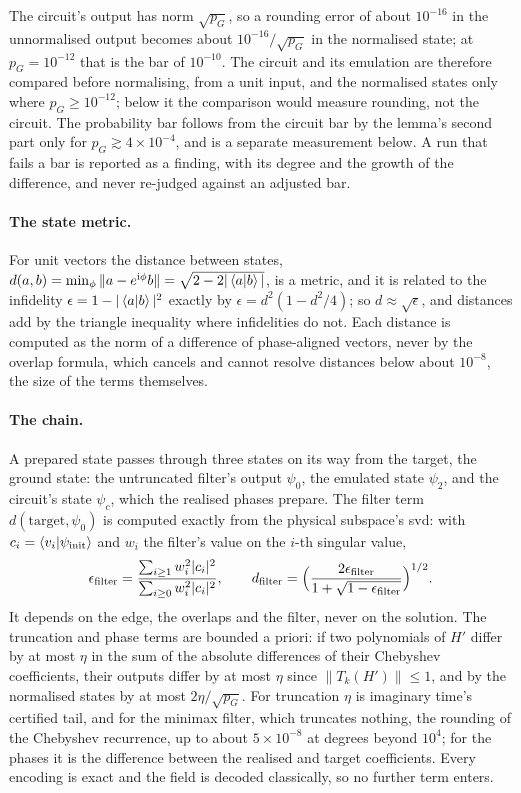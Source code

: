 The circuit's output has norm $\sqrt{p_G}$, so a rounding error of about $10^{-16}$ in the unnormalised output becomes about $10^{-16}/\sqrt{p_G}$ in the normalised state; at $p_G=10^{-12}$ that is the bar of $10^{-10}$. The circuit and its emulation are therefore compared before normalising, from a unit input, and the normalised states only where $p_G\ge10^{-12}$; below it the comparison would measure rounding, not the circuit. The probability bar follows from the circuit bar by the lemma's second part only for $p_G\gtrsim4\times10^{-4}$, and is a separate measurement below. A run that fails a bar is reported as a finding, with its degree and the growth of the difference, and never re-judged against an adjusted bar.

\paragraph{The state metric.} For unit vectors the distance between states, $d(a,b)=\min_\phi\|a-e^{\mathrm{i}\phi}b\|=\sqrt{2-2|\braket{a|b}|}$, is a metric, and it is related to the infidelity $\epsilon=1-|\braket{a|b}|^2$ exactly by $\epsilon=d^2(1-d^2/4)$; so $d\approx\sqrt\epsilon$, and distances add by the triangle inequality where infidelities do not. Each distance is computed as the norm of a difference of phase-aligned vectors, never by the overlap formula, which cancels and cannot resolve distances below about $10^{-8}$, the size of the terms themselves.

\paragraph{The chain.} A prepared state passes through three states on its way from the target, the ground state: the untruncated filter's output $\psi_0$, the emulated state $\psi_2$, and the circuit's state $\psi_c$, which the realised phases prepare. The filter term $d(\text{target},\psi_0)$ is computed exactly from the physical subspace's \gls{svd}: with $c_i=\braket{v_i|\psi_{\mathrm{init}}}$ and $w_i$ the filter's value on the $i$-th singular value,
\begin{equation*}
    \epsilon_{\mathrm{filter}}=\frac{\sum_{i\ge1}w_i^2|c_i|^2}{\sum_{i\ge0}w_i^2|c_i|^2},
    \qquad
    d_{\mathrm{filter}}=\Bigl(\frac{2\epsilon_{\mathrm{filter}}}{1+\sqrt{1-\epsilon_{\mathrm{filter}}}}\Bigr)^{1/2}.
\end{equation*}
It depends on the edge, the overlaps and the filter, never on the solution. The truncation and phase terms are bounded a priori: if two polynomials of $H'$ differ by at most $\eta$ in the sum of the absolute differences of their Chebyshev coefficients, their outputs differ by at most $\eta$ since $\|T_k(H')\|\le1$, and by  the normalised states by at most $2\eta/\sqrt{p_G}$. For truncation $\eta$ is imaginary time's certified tail, and for the minimax filter, which truncates nothing, the rounding of the Chebyshev recurrence, up to about $5\times10^{-8}$ at degrees beyond $10^4$; for the phases it is the difference between the realised and target coefficients. Every encoding is exact and the field is decoded classically, so no further term enters.

